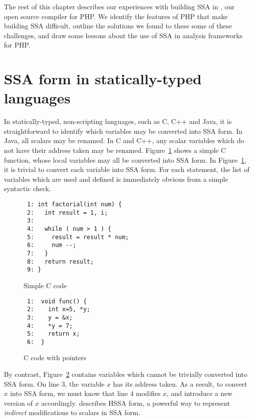 The rest of this chapter describes our experiences with building SSA
in \phc, our open source compiler for PHP.  We identify the features
of PHP that make building SSA difficult, outline the solutions we
found to these some of these challenges, and draw some lessons about
the use of SSA in analysis frameworks for PHP.



\section{SSA form in statically-typed languages}

In statically-typed, non-scripting languages, such as C, C++ and Java,
it is straightforward to identify which variables may be converted
into SSA form.  In Java, all scalars may be renamed.  In C and C++,
any scalar variables which do not have their address taken may be
renamed.  Figure~\ref{c-easy-example} shows a simple C function, whose
local variables may all be converted into SSA form.  In Figure~\ref{c-easy-example}, it is trivial to convert each variable into SSA
form.  For each statement, the list of variables which are used and
defined is immediately obvious from a simple syntactic check.

\begin{figure}[thp]
\begin{verbatim}
 1: int factorial(int num) {
 2:   int result = 1, i;
 3:
 4:   while ( num > 1 ) {
 5:     result = result * num;
 6:     num --;
 7:   }
 8:   return result;
 9: }
\end{verbatim}
\caption{Simple C code}
\label{c-easy-example}
\end{figure}


\begin{figure}[thp]
\begin{verbatim}
 1:  void func() {
 2:    int x=5, *y;
 3:    y = &x;
 4:    *y = 7;
 5:    return x;
 6:  }
\end{verbatim}
\caption{C code with pointers}
\label{c-hard-example}
\end{figure}




By contrast, Figure~\ref{c-hard-example} contains variables which
cannot be trivially converted into SSA form.  On line 3, the variable
$x$ has its address taken.  As a result, to convert $x$ into SSA form,
we must know that line 4 modifies $x$, and introduce a new version of
$x$ accordingly.   describes HSSA form, a powerful way to
represent \textit{indirect} modifications to scalars in SSA form.

